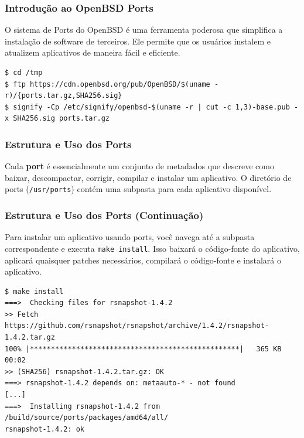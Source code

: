 \documentclass[9pt,xcolor=table]{beamer}
\begin{document}
\begin{frame}[fragile]
\frametitle{Introdução ao OpenBSD Ports}
\justifying
O sistema de Ports do OpenBSD é uma ferramenta poderosa que simplifica a instalação de software de terceiros. Ele permite que os usuários instalem e atualizem aplicativos de maneira fácil e eficiente.
\vspace{0.5cm}
\begin{lstlisting}
$ cd /tmp
$ ftp https://cdn.openbsd.org/pub/OpenBSD/$(uname -r)/{ports.tar.gz,SHA256.sig}
$ signify -Cp /etc/signify/openbsd-$(uname -r | cut -c 1,3)-base.pub -x SHA256.sig ports.tar.gz
\end{lstlisting}
\end{frame}
\begin{frame}[fragile]
\frametitle{Estrutura e Uso dos Ports}
\justifying
Cada \textbf{port} é essencialmente um conjunto de metadados que descreve como baixar, descompactar, corrigir, compilar e instalar um aplicativo. O diretório de ports (\verb|/usr/ports|) contém uma subpasta para cada aplicativo disponível.
\vspace{0.5cm}
\end{frame}
\begin{frame}[fragile]
\frametitle{Estrutura e Uso dos Ports (Continuação)}
\justifying
Para instalar um aplicativo usando ports, você navega até a subpasta correspondente e executa \verb|make install|. Isso baixará o código-fonte do aplicativo, aplicará quaisquer patches necessários, compilará o código-fonte e instalará o aplicativo.
\vspace{0.5cm}
\begin{lstlisting}
$ make install
===>  Checking files for rsnapshot-1.4.2
>> Fetch https://github.com/rsnapshot/rsnapshot/archive/1.4.2/rsnapshot-1.4.2.tar.gz
100% |**************************************************|   365 KB    00:02
>> (SHA256) rsnapshot-1.4.2.tar.gz: OK
===> rsnapshot-1.4.2 depends on: metaauto-* - not found
[...]
===>  Installing rsnapshot-1.4.2 from /build/source/ports/packages/amd64/all/
rsnapshot-1.4.2: ok
\end{lstlisting}
\end{frame}
\end{document}

